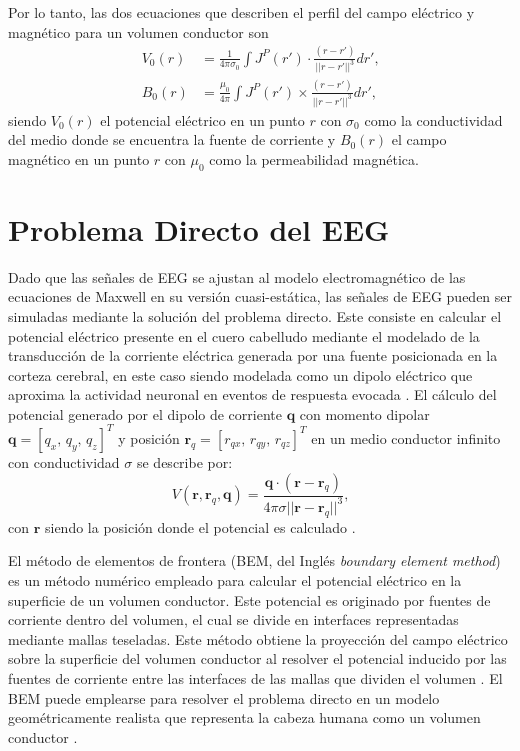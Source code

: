 Por lo tanto, las dos ecuaciones que describen el perfil del campo eléctrico y magnético para un volumen conductor son
\begin{align}
	V_0(r) & = \frac{1}{4\pi\sigma_0} \int J^{P}(r') \cdot \frac{(r - r')}{||r - r'||^3} dr' \text{,} \label{eq:forward1} \\
	B_0(r) & = \frac{\mu_{0}}{4\pi} \int J^{P}(r') \times \frac{(r - r')}{||r - r'||^3} dr' \text{,} \label{eq:forward2}
\end{align}
siendo $V_0(r)$ el potencial eléctrico en un punto $r$ con $\sigma_{0}$ como la conductividad del medio donde se encuentra la fuente de corriente y $B_0(r)$ el campo magnético en un punto $r$ con $\mu_{0}$ como la permeabilidad magnética.

\section{Problema Directo del EEG}
\label{sec:intro:direct}

Dado que las señales de EEG se ajustan al modelo electromagnético de las ecuaciones de Maxwell en su versión cuasi-estática, las señales de EEG pueden ser simuladas mediante la solución del problema directo.
Este consiste en calcular el potencial eléctrico presente en el cuero cabelludo mediante el modelado de la transducción de la corriente eléctrica generada por una fuente posicionada en la corteza cerebral, en este caso siendo modelada como un dipolo eléctrico que aproxima la actividad neuronal en eventos de respuesta evocada \cite{Mosher1999, Hallez2007}.
El cálculo del potencial generado por el dipolo de corriente $\mathbf{q}$ con momento dipolar  $\mathbf{q} = [q_x,\,q_y,\,q_z]^T$ y posición $\mathbf{r}_{q} = [r_{qx},\,r_{qy},\,r_{qz}]^T$ en un medio conductor infinito con conductividad $\sigma$ se describe por: 
\begin{equation}
	\label{fdip}
	V(\mathbf{r},\mathbf{r}_{q},\mathbf{q})=\frac{\mathbf{q}\cdot(\mathbf{r}-\mathbf{r}_{q})}{4\pi \sigma {||\mathbf{r}-\mathbf{r}_{q}||}^{3}}\text{,}
\end{equation}
con $\mathbf{r}$ siendo la posición donde el potencial es calculado \cite{Hallez2007}.

El método de elementos de frontera (BEM, del Inglés \emph{boundary element method}) es un método numérico empleado para calcular el potencial eléctrico en la superficie de un volumen conductor. Este potencial es originado por fuentes de corriente dentro del volumen, el cual se divide en interfaces representadas mediante mallas teseladas.
Este método obtiene la proyección del campo eléctrico sobre la superficie del volumen conductor al resolver el potencial inducido por las fuentes de corriente entre las interfaces de las mallas que dividen el volumen \cite{Hallez2007}.
El BEM puede emplearse para resolver el problema directo en un modelo geométricamente realista que representa la cabeza humana como un volumen conductor \cite{Ermer2001}.

